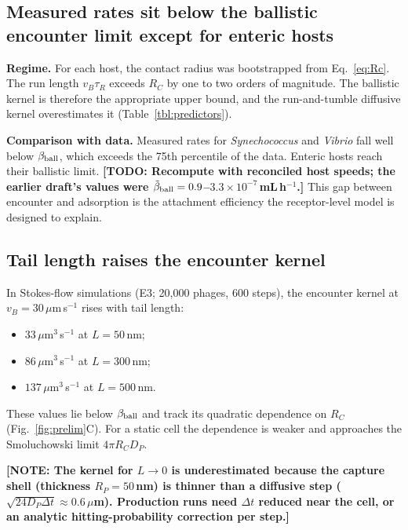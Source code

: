 \documentclass[12pt]{article}
\newcommand{\note}[1]{{\color{red}\textbf{[NOTE: #1]}}}
\newcommand{\todo}[1]{{\color{blue}\textbf{[TODO: #1]}}}
\newcommand{\prelim}[1]{{\color{orange!80!black}#1}}
\begin{document}
\subsection*{Measured rates sit below the ballistic encounter limit except for enteric hosts}
\textbf{Regime.} For each host, the contact radius was bootstrapped from Eq.~\eqref{eq:Rc}. The run length $v_B\tau_R$ exceeds $R_C$ by one to two orders of magnitude. The ballistic kernel is therefore the appropriate upper bound, and the run-and-tumble diffusive kernel overestimates it (Table~\ref{tbl:predictors}).

\textbf{Comparison with data.} Measured rates for \textit{Synechococcus} and \textit{Vibrio} fall well below $\beta_{\rm ball}$, which exceeds the 75th percentile of the data. Enteric hosts reach their ballistic limit. \todo{Recompute with reconciled host speeds; the earlier draft's values were $\tilde\beta_{\rm ball}=0.9$--$3.3\times10^{-7}$\,mL\,h$^{-1}$.} This gap between encounter and adsorption is the attachment efficiency the receptor-level model is designed to explain.

\subsection*{Tail length raises the encounter kernel}
In Stokes-flow simulations (E3; \prelim{20{,}000 phages, 600 steps}), the encounter kernel at $v_B=30\,\mu$m\,s$^{-1}$ rises with tail length:
\begin{itemize}\setlength\itemsep{0pt}
\item \prelim{$33\,\mu$m$^3$\,s$^{-1}$ at $L=50$\,nm;}
\item \prelim{$86\,\mu$m$^3$\,s$^{-1}$ at $L=300$\,nm;}
\item \prelim{$137\,\mu$m$^3$\,s$^{-1}$ at $L=500$\,nm.}
\end{itemize}
These values lie below $\beta_{\rm ball}$ and track its quadratic dependence on $R_C$ (Fig.~\ref{fig:prelim}C). For a static cell the dependence is weaker and approaches the Smoluchowski limit $4\pi R_C D_P$.

\note{The kernel for $L\to0$ is underestimated because the capture shell (thickness $R_P=50$\,nm) is thinner than a diffusive step ($\sqrt{24D_P\Delta t}\approx0.6\,\mu$m). Production runs need $\Delta t$ reduced near the cell, or an analytic hitting-probability correction per step.}
\end{document}
